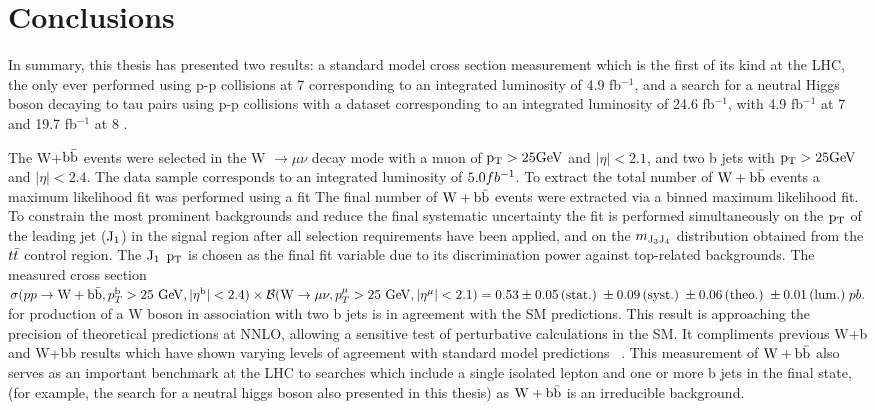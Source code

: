 \chapter{Conclusions}
In summary, this thesis has presented two results:
a standard model cross section measurement 
which is the first of its kind at the LHC, the only
ever performed using p-p collisions at 7 \TeV corresponding to
an integrated luminosity of 4.9 fb$^{-1}$, and a search for 
a neutral Higgs boson decaying to tau pairs using p-p collisions
with a dataset corresponding to an integrated luminosity of 
24.6 fb$^{-1}$, with 4.9 fb$^{-1}$ at 7 \TeV and 19.7 fb$^{-1}$ at 8 \TeV. 

The W+$\mathrm{b\bar{b}}$ events were selected in the W $\to \mu\nu$ decay mode with a 
muon of $\mathrm{p_{T}}>25\mathrm{GeV}$ and $|\eta|<2.1$, and two b jets with $\mathrm{p_{T}}>25\mathrm{GeV}$ and $|\eta|<2.4$. 
The data sample corresponds to an integrated luminosity of $5.0fb^\mathrm{-1}$. 
To extract the total number of $\mathrm{W+\mathrm{b\bar{b}}}$ events a maximum likelihood fit
was performed using a fit 
The final number of $\mathrm{W+\mathrm{b\bar{b}}}$ events were extracted via a binned maximum likelihood fit.
To constrain the most prominent backgrounds and reduce the final
systematic uncertainty the fit is performed simultaneously on the $\mathrm{p_{T}}$ of the leading jet ($\rm{J_1}$) 
in the signal region after all selection requirements have been applied,
and on the $m_{\rm{J_3 J_4}}$ distribution obtained from the $t\bar{t}$ control region.
The  $\rm{J_1}$ $\mathrm{p_{T}}$  is chosen as the final fit variable due to its discrimination power against top-related backgrounds. The measured cross section 
$\sigma(pp\rightarrow \mathrm{W} + \mathrm{b\bar{b}}, p_T^{\mathrm{b}}>25~\mathrm{GeV}, |\eta^{\mathrm{b}}|<2.4)\times {\cal{B}}(\mathrm{W}\rightarrow \mu\nu, p_T^{\mu}>25~\mathrm{GeV}, |\eta^{\mu}|<2.1) =0.53\pm  0.05\,\mathrm{(stat.)\;} \pm 0.09 \,\mathrm{(syst.)\;} \pm 0.06 \,\mathrm{(theo.)}\; \pm 0.01\,\mathrm{(lum.)\;} pb.$
for production of a W boson in association with two b jets is in agreement with
the SM predictions.
This result is approaching the precision of theoretical predictions at NNLO, 
allowing a sensitive test of perturbative calculations
in the SM. It compliments previous W+b and W+bb results which
have shown varying levels of agreement 
with standard model predictions ~\cite{Aaltonen:2009qi,D0:2012qt,Aad:2011kp}. 
This measurement of $\mathrm{W+\mathrm{b\bar{b}}}$ also serves as an important
benchmark at the LHC to 
searches which include a single isolated lepton and one or more b jets in the final state,
(for example, the search for a neutral higgs boson also presented in this thesis) 
as $\mathrm{W+\mathrm{b\bar{b}}}$ is an irreducible background. %

